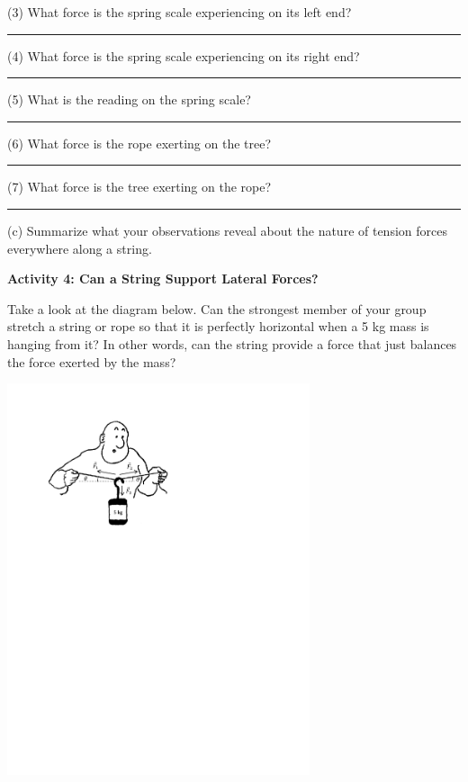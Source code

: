 (3) What force is the spring scale experiencing on its left end? \rule{1.0in}{0.1pt}

(4) What force is the spring scale experiencing on its right end? \rule{1.0in}{0.1pt}

(5) What is the reading on the spring scale? \rule{1.0in}{0.1pt}

(6) What force is the rope exerting on the tree? \rule{1.0in}{0.1pt}

(7) What force is the tree exerting on the rope? \rule{1.0in}{0.1pt}

(c) Summarize what your observations reveal about the nature of tension forces
everywhere along a string.
\answerspace{15mm}

\textbf{Activity 4: Can a String Support Lateral Forces? }

Take a look at the diagram below. Can the strongest member of your group stretch
a string or rope so that it is perfectly horizontal when a 5 kg mass is hanging
from it? In other words, can the string provide a force that just balances the
force exerted by the mass?

{\par\centering \includegraphics[width=3.5in]{newton/newton_fig7_new.pdf} \par}

\pagebreak[3]

